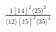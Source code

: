 \documentclass[varwidth, border=5pt]{standalone}
\begin{document}
\begin{my}
$\begin{gathered}
\scriptscriptstyle\frac{1[14]^2⟨25⟩^2}{⟨12⟩[15]^2⟨35⟩^2}
\end{gathered}$
\end{my}
\end{document}
